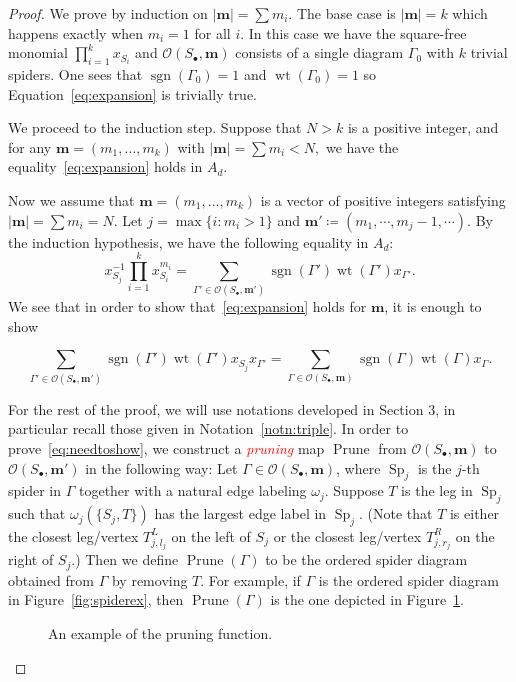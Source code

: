 \documentclass[ALCO,ThmDefs,Unicode,epreuves]{cedram}
\newcommand{\bm}[1]{{\boldsymbol{#1}}}
\newcommand\m{\bm{m}}
\newcommand{\important}[1]{\emph{\textcolor{red}{#1}}}
\DeclareMathOperator{\wt}{wt}
\DeclareMathOperator{\prune}{Prune}
\DeclareMathOperator{\Sp}{Sp}
\DeclareMathOperator{\sgn}{sgn}
\newcommand{\D}{{\Gamma}}
\newcommand{\lspd}{\mathcal O}
\begin{document}
\begin{proof}
	
	We prove by induction on $|\m|=\sum m_i$. 
	The base case is $|\m| = k$ which happens exactly when $m_i=1$ for all $i$. In this case we have the square-free monomial $\prod_{i=1}^k x_{S_i}$ and $\lspd(S_\bullet,\m)$ consists of a single diagram $\D_0$ with $k$ trivial spiders. One sees that $\sgn(\D_0)=1$ and $\wt(\D_0)=1$ so Equation~\eqref{eq:expansion} is trivially true.
	
	We proceed to the induction step. Suppose that $N > k$ is a positive integer, and for any $\m=(m_1, \dots, m_k)$ with $|\m| = \sum m_i < N,$ we have the equality~\eqref{eq:expansion} holds in $A_d.$
	
	Now we assume that $\m=(m_1, \dots, m_k)$ is a vector of positive integers satisfying $|\m| = \sum m_i =N.$
	Let $j=\max\{i:m_i>1\}$ and $\m'\coloneqq (m_1,\cdots,m_j-1,\cdots)$. By the induction hypothesis, we have the following equality in $A_d:$
	\begin{equation}\label{eq:induction}
	x_{S_j}^{-1}\prod_{i=1}^k x_{S_i}^{m_i}=\sum_{\D'\in\lspd(S_\bullet,\m')}\sgn(\D')\wt(\D')x_{\D'}.
	\end{equation}
	We see that in order to show that~\eqref{eq:expansion} holds for $\m$, it is enough to show
	
	\begin{equation}\label{eq:needtoshow}
	\sum_{\D'\in\lspd(S_\bullet,\m')}\sgn(\D')\wt(\D')x_{S_j}x_{\D'} = \sum_{\D\in\lspd(S_\bullet,\m)}\sgn(\D)\wt(\D)x_\D.
	\end{equation}
	
	
	
	For the rest of the proof, we will use notations developed in Section 3, in particular recall those given in Notation~\ref{notn:triple}.
	In order to prove~\eqref{eq:needtoshow}, we construct a \important{pruning} map $\prune$ from $\lspd(S_\bullet,\m)$ to $\lspd(S_\bullet, \m')$ in the following way: Let $\D \in \lspd(S_\bullet,\m)$, where $\Sp_j$ is the $j$-th spider in $\D$ together with a natural edge labeling $\omega_j$. Suppose $T$ is the leg in $\Sp_j$ such that $\omega_j\left(\{S_j,T\}\right)$ has the largest edge label in $\Sp_j$. (Note that $T$ is either the closest leg/vertex $T^L_{j,l_j}$ on the left of $S_j$ or the closest leg/vertex $T^R_{j,r_j}$ on the right of $S_j$.) Then we define $\prune(\D)$ to be the ordered spider diagram obtained from $\D$ by removing $T$. For example, if $\D$ is the ordered spider diagram in Figure~\ref{fig:spiderex}, then $\prune(\D)$ is the one depicted in Figure~\ref{fig:prune}.
	\begin{figure}[ht]
		
		\caption{An example of the pruning function.}
		\label{fig:prune}
	\end{figure}
	

\end{proof}
\end{document}
